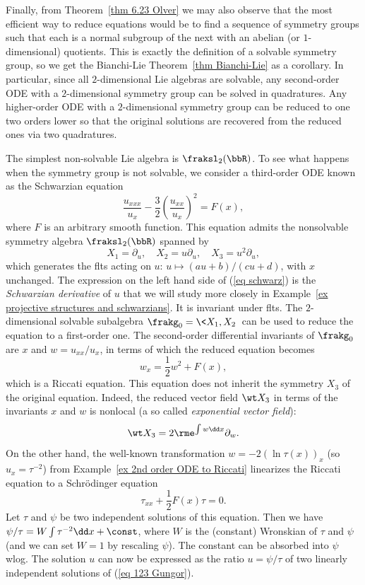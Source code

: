 Finally, from Theorem~\ref{thm 6.23 Olver} we may also observe that the most efficient way to reduce equations would be to find a sequence of symmetry groups such that each is a normal subgroup of the next with an abelian (or $1$-dimensional) quotients. This is exactly the definition of a solvable symmetry group, so we get the Bianchi-Lie Theorem~\ref{thm Bianchi-Lie} as a corollary. In particular, since all $2$-dimensional Lie algebras are solvable, any second-order ODE with a $2$-dimensional symmetry group can be solved in quadratures. Any higher-order ODE with a $2$-dimensional symmetry group can be reduced to one two orders lower so that the original solutions are recovered from the reduced ones via two quadratures.

\begin{example}
    The simplest non-solvable Lie algebra is $\fraksl_2(\bbR)$. To see what happens when the symmetry group is not solvable, we consider a third-order ODE known as the Schwarzian equation 
    \[\frac{u_{xxx}}{u_x}-\frac32\left(\frac{u_{xx}}{u_x}\right)^2=F(x),\label{eq schwarz}\]
    where $F$ is an arbitrary smooth function. This equation admits the nonsolvable symmetry algebra $\fraksl_2(\bbR)$ spanned by 
    \[X_1=\partial_u,\quad X_2=u\partial_u,\quad X_3=u^2\partial_u,\]
    which generates the \glspl{flt} acting on $u$: $u\mapsto (au+b)/(cu+d)$, with $x$ unchanged. The expression on the left hand side of (\ref{eq schwarz}) is the \emph{Schwarzian derivative} of $u$ that we will study more closely in Example~\ref{ex projective structures and schwarzians}. It is invariant under \glspl{flt}. The $2$-dimensional solvable subalgebra $\frakg_0=\<X_1,X_2\>$ can be used to reduce the equation to a first-order one. The second-order differential invariants of $\frakg_0$ are $x$ and $w=u_{xx}/u_x$, in terms of which the reduced equation becomes 
    \[w_x=\frac12 w^2+F(x),\]
    which is a Riccati equation. This equation does not inherit the symmetry $X_3$ of the original equation. Indeed, the reduced vector field $\wt X_3$ in terms of the invariants $x$ and $w$ is nonlocal (a so called \emph{exponential vector field}):
    \[\wt X_3=2\rme^{\int w\dd x}\partial_w.\]
    On the other hand, the well-known transformation $w=-2(\ln \tau(x))_x$ (so $u_x=\tau^{-2}$) from Example~\ref{ex 2nd order ODE to Riccati} linearizes the Riccati equation to a Schr\"odinger equation
    \[\tau_{xx}+\frac12F(x)\tau=0.\label{eq 123 Gungor}\]
    Let $\tau$ and $\psi$ be two independent solutions of this equation. Then we have $\psi/\tau=W\int \tau^{-2}\dd x+\const$, where $W$ is the (constant) Wronskian of $\tau$ and $\psi$ (and we can set $W=1$ by rescaling $\psi$). The constant can be absorbed into $\psi$ \gls{wlog}. The solution $u$ can now be expressed as the ratio $u=\psi/\tau$ of two linearly independent solutions of (\ref{eq 123 Gungor}).


\end{example}
